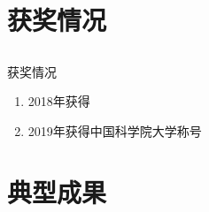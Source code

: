 \documentclass[xcolor=dvipsnames]{beamer} %
\begin{document}
\section{获奖情况}
\subsection{}
\begin{frame}{获奖情况}
    \begin{enumerate}[<+->]   
        \item 2018年获得
        \vspace{2mm}
        \item 2019年获得中国科学院大学称号
    \end{enumerate} 
\end{frame}

\section{典型成果}
\subsection{}
\end{document}
